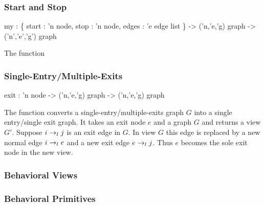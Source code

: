 \subsubsection{Start and Stop}
\begin{SML}
   my  :
     \{ start : 'n node,
        stop  : 'n node,
        edges : 'e edge list
     \} -> ('n,'e,'g) graph -> ('n','e','g') graph
\end{SML}

The function 

\subsubsection{Single-Entry/Multiple-Exits}
\begin{SML}
     exit : 'n node -> ('n,'e,'g) graph -> ('n,'e,'g) graph
\end{SML}

The function  converts a single-entry/multiple-exits 
graph $G$ into a single entry/single exit graph.
It takes an exit node $e$ and a graph $G$ and returns
a view $G'$.  Suppose $i \rightarrow_{l} j$ is an exit edge in $G$.
In view $G$ this edge is replaced by a new normal edge $i \rightarrow_{l} e$
and a new exit edge $e \rightarrow_{l} j$.  Thus $e$ becomes the sole exit
node in the new view.  

\subsubsection{Behavioral Views}

\subsubsection{Behavioral Primitives}

